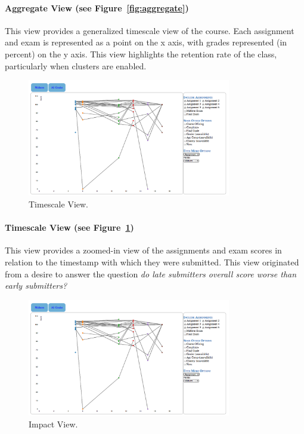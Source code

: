 \paragraph{Aggregate View (see Figure~\ref{fig:aggregate}) }
This view provides a generalized timescale view of the course. Each assignment and exam is represented as a point on the x axis, with grades represented (in percent) on the y axis. This view highlights the retention rate of the class, particularly when clusters are enabled. 


\begin{figure}[htb]
 \centering
 \includegraphics[width=3.5in]{aggregate_stub.png}
 \caption{Timescale View.}
 \label{fig:timescale}	
\end{figure}

\paragraph{Timescale View (see Figure~\ref{fig:timescale}) }
This view provides a zoomed-in view of the assignments and exam scores in relation to the timestamp with which they were submitted. This view originated from a desire to answer the question \emph{do late submitters overall score worse than early submitters?}


\begin{figure}[htb]
 \centering
 \includegraphics[width=3.5in]{aggregate_stub.png}
 \caption{Impact View.}
 \label{fig:impact}	
\end{figure}

